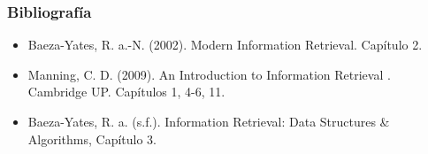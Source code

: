 \documentclass[
10pt, %
aspectratio=169, %
]{beamer}
\begin{document}
	\begin{frame}
		
		\frametitle{Bibliografía}
		
		\begin{itemize}
			\item Baeza-Yates, R. a.-N. (2002). Modern Information Retrieval. Capítulo 2.
			\item Manning, C. D. (2009). An Introduction to Information Retrieval . Cambridge UP. Capítulos 1, 4-6, 11.
			\item Baeza-Yates, R. a. (s.f.). Information Retrieval: Data Structures \& Algorithms, Capítulo 3.
		\end{itemize}
		
	\end{frame}
	
	\begin{frame}
		\titlepage
	\end{frame}
	
	
	
\end{document}
